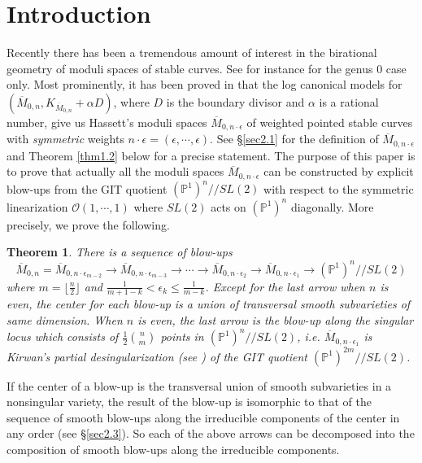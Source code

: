 \documentclass[10pt]{amsart}
\newtheorem{theorem}{Theorem}[section]
\theoremstyle{definition}
\newcommand{\PP}{\mathbb{P}}
\newcommand{\cO}{\mathcal{O} }
\def\Mzn{\overline{M}_{0,n} }
\def\Mzeo{\overline{M}_{0,n\cdot \epsilon_1} }
\def\Mzet{\overline{M}_{0,n\cdot \epsilon_2} }
\def\Mzemt{\overline{M}_{0,n\cdot \epsilon_{m-2}} }
\def\Mzemth{\overline{M}_{0,n\cdot \epsilon_{m-3}} }
\def\Mze{\overline{M}_{0,n\cdot \epsilon} }
\def\git{/\!/ }
\begin{document}
\section{Introduction}\label{sec1}
Recently there has been a tremendous amount of interest in the
birational geometry of moduli spaces of stable curves. See for
instance \cite{AlexSwin, FedoSmyt,Hassett,Kapranov,Keel,Li,
Mustata, Simpson} for the genus 0 case only. Most prominently, it
has been proved in \cite{AlexSwin, FedoSmyt,Simpson} that the log
canonical models for $(\Mzn, K_{\Mzn}+\alpha D)$, where $D$ is the
boundary divisor and $\alpha$ is a rational number, give us
Hassett's moduli spaces $\Mze$ of weighted pointed stable curves
with \emph{symmetric} weights $n\cdot \epsilon =(\epsilon,\cdots,
\epsilon)$. See \S\ref{sec2.1} for the definition of $\Mze$ and
Theorem \ref{thm1.2} below for a precise statement. The purpose of
this paper is to prove that actually all the moduli spaces $\Mze$
can be constructed by explicit blow-ups from the GIT quotient
$(\PP^1)^n\git SL(2)$ with respect to the symmetric linearization
$\cO(1,\cdots,1)$ where $SL(2)$ acts on $(\PP^1)^n$ diagonally.
More precisely, we prove the following.
\begin{theorem}\label{thm1.1} There is a sequence of blow-ups
\begin{equation}\label{eq1}
\Mzn=\Mzemt\to \Mzemth\to \cdots \to \Mzet\to \Mzeo\to
(\PP^1)^n\git SL(2) \end{equation} where
$m=\lfloor\frac{n}{2}\rfloor$ and $\frac1{m+1-k}<\epsilon_k\le
\frac1{m-k}$. Except for the last arrow when $n$ is even, the
center for each blow-up is a union of transversal smooth
subvarieties of same dimension.  When $n$ is even, the last arrow
is the blow-up along the singular locus which consists of
$\frac12\binom{n}{m}$ points in $(\PP^1)^n\git SL(2)$, i.e.
$\Mzeo$ is Kirwan's partial desingularization (see \cite{Kirwan})
of the GIT quotient $(\PP^1)^{2m}\git SL(2)$.\end{theorem} If the
center of a blow-up is the transversal union of smooth
subvarieties in a nonsingular variety, the result of the blow-up
is isomorphic to that of the sequence of smooth blow-ups along the
irreducible components of the center in any order (see
\S\ref{sec2.3}). So each of the above arrows can be decomposed
into the composition of smooth blow-ups along the irreducible
components.
\end{document}
